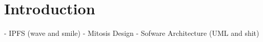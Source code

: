 \chapter{Introduction}
- IPFS (wave and smile)
- Mitosis Design
- Sofware Architecture (UML and shit)
